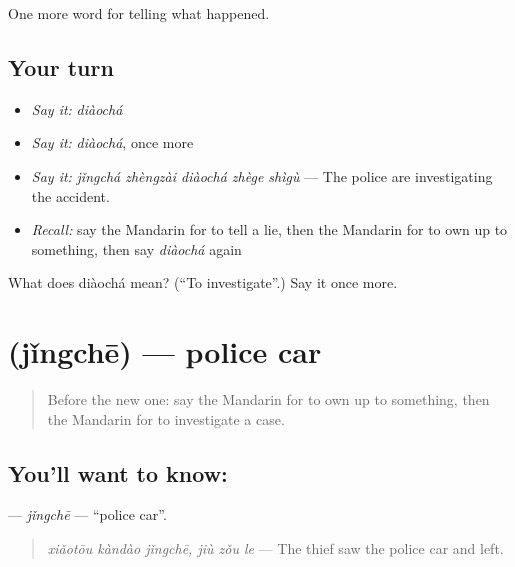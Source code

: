 \begin{grammarlens}[title={What you've built}]
One more word for telling what happened.
\end{grammarlens}

\subsection*{Your turn}
\begin{itemize}
\raggedright
  \item \emph{Say it:} \emph{diàochá}
  \item \emph{Say it:} \emph{diàochá}, once more
  \item \emph{Say it:} \emph{jǐngchá zhèngzài diàochá zhège shìgù} — The police are investigating the accident.
  \item \emph{Recall:} say the Mandarin for to tell a lie, then the Mandarin for to own up to something, then say \emph{diàochá} again
\end{itemize}

\begin{tcolorbox}[breakable,colback=teal!4,colframe=teal!35!black,title={Before you move on}]
What does diàochá mean? (\textquotedblleft{}To investigate\textquotedblright{}.) Say it once more.
\end{tcolorbox}
\section[\texorpdfstring{\zh{警车} (jǐngchē)}{警车 (jǐngchē)}]{ (jǐngchē) — police car}

\label{lesson:ZH-C311-jingche}



\begin{quote}
Before the new one: say the Mandarin for to own up to something, then the Mandarin for to investigate a case.
\end{quote}

\subsection*{You'll want to know: }
\textbf{} — \emph{jǐngchē} — \textquotedblleft{}police car\textquotedblright{}.

\begin{quote}
\textbf{} \emph{xiǎotōu kàndào jǐngchē, jiù zǒu le} — The thief saw the police car and left.
\end{quote}

